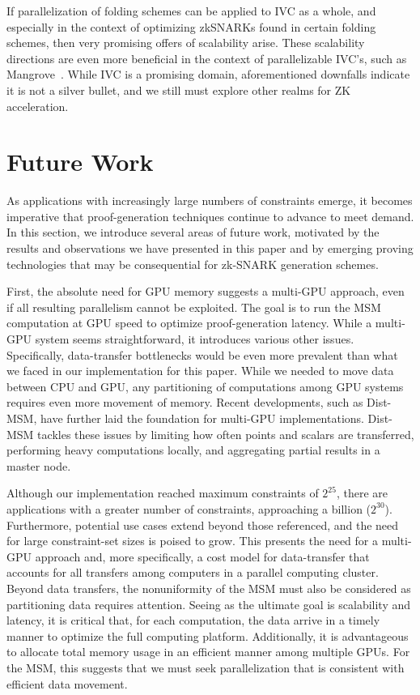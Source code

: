 \documentclass[sigconf]{acmart}
\begin{document}
If parallelization of folding schemes can be applied to IVC as a whole, and especially in the context of optimizing zkSNARKs found in certain folding schemes, then very promising offers of scalability arise. These scalability directions are even more beneficial in the context of parallelizable IVC's, such as Mangrove~\cite{Mangrove}. While IVC is a promising domain, aforementioned downfalls indicate it is not a silver bullet, and we still must explore other realms for ZK acceleration.

\section{Future Work}
\label{sec:future}
As applications with increasingly large numbers of  constraints emerge, it becomes imperative that proof-generation techniques continue to advance to meet demand. In this section, we introduce several areas of future work, motivated by the results and observations we have presented in this paper and by emerging proving technologies that may be consequential for zk-SNARK generation schemes.

First, the absolute need for GPU memory suggests a multi-GPU approach, even if all resulting parallelism cannot be exploited. The goal is to run the MSM computation at GPU speed to optimize proof-generation latency. While a multi-GPU system seems straightforward, it introduces various other issues. Specifically, data-transfer bottlenecks would be even more prevalent than what we faced in our implementation for this paper. While we needed to move data between CPU and GPU, any partitioning of computations among GPU systems requires even more movement of memory. Recent developments, such as Dist-MSM\cite{distmsm}, have further laid the foundation for multi-GPU implementations. Dist-MSM tackles these issues by limiting how often points and scalars are transferred, performing heavy computations locally, and aggregating partial results in a master node.

Although our implementation reached maximum constraints of $2^{25}$, there are applications with a greater number of constraints, approaching a billion ($2^{30}$). Furthermore, potential use cases extend beyond those referenced, and the need for large constraint-set sizes is poised to grow. This presents the need for a multi-GPU approach and, more specifically, a cost model for data-transfer that accounts for all transfers among computers in a parallel computing cluster. Beyond data transfers, the nonuniformity of the MSM must also be considered as partitioning data requires attention. Seeing as the ultimate goal is scalability and latency, it is critical that, for each computation, the data arrive in a timely manner to optimize the full computing platform. Additionally, it is advantageous to allocate total memory usage in an efficient manner among multiple GPUs.  For the MSM, this suggests that we must seek parallelization that is consistent with efficient data movement. 
\end{document}
